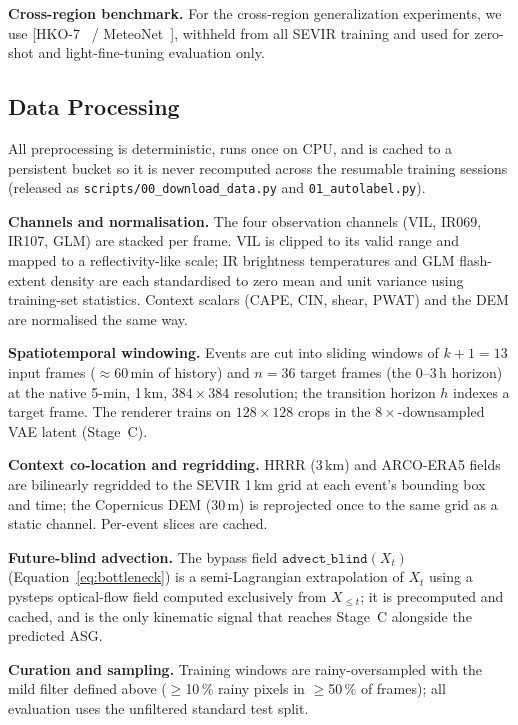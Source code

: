 \documentclass[fleqn,10pt]{wlscirep}
\begin{document}
\textbf{Cross-region benchmark.}
For the cross-region generalization experiments, we use [HKO-7~\cite{shi2017trajgru} / MeteoNet~\cite{larvor2020meteonet}], withheld from all SEVIR training and used for zero-shot and light-fine-tuning evaluation only.

\subsection*{Data Processing}

All preprocessing is deterministic, runs once on CPU, and is cached to a persistent bucket so it is never recomputed across the resumable training sessions (released as \texttt{scripts/00\_download\_data.py} and \texttt{01\_autolabel.py}).

\textbf{Channels and normalisation.} The four observation channels (VIL, IR069, IR107, GLM) are stacked per frame. VIL is clipped to its valid range and mapped to a reflectivity-like scale; IR brightness temperatures and GLM flash-extent density are each standardised to zero mean and unit variance using training-set statistics. Context scalars (CAPE, CIN, shear, PWAT) and the DEM are normalised the same way.

\textbf{Spatiotemporal windowing.} Events are cut into sliding windows of $k{+}1{=}13$ input frames ($\approx$60\,min of history) and $n{=}36$ target frames (the 0--3\,h horizon) at the native 5-min, 1\,km, $384{\times}384$ resolution; the transition horizon $h$ indexes a target frame. The renderer trains on $128{\times}128$ crops in the $8\times$-downsampled VAE latent (Stage~C).

\textbf{Context co-location and regridding.} HRRR (3\,km) and ARCO-ERA5 fields are bilinearly regridded to the SEVIR 1\,km grid at each event's bounding box and time; the Copernicus DEM (30\,m) is reprojected once to the same grid as a static channel. Per-event slices are cached.

\textbf{Future-blind advection.} The bypass field $\texttt{advect\_blind}(X_t)$ (Equation~\ref{eq:bottleneck}) is a semi-Lagrangian extrapolation of $X_t$ using a pysteps optical-flow field computed exclusively from $X_{\le t}$; it is precomputed and cached, and is the only kinematic signal that reaches Stage~C alongside the predicted ASG.

\textbf{Curation and sampling.} Training windows are rainy-oversampled with the mild filter defined above ($\ge$10\,\% rainy pixels in $\ge$50\,\% of frames); all evaluation uses the unfiltered standard test split.
\end{document}
